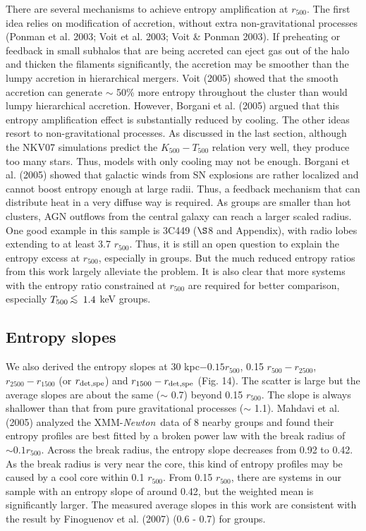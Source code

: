 \documentclass{aastex}
\newcommand{\lsim}{\mbox{\hspace{.2em}\raisebox{.5ex}{$<$}\hspace{-.8em}\raisebox{-.5ex}{$\sim$}
\hspace{.2em}}}
\def\xmm        {XMM-{\em Newton}\/}
\begin{document}
There are several mechanisms to achieve entropy amplification at $r_{500}$.
The first idea relies on modification of accretion, without extra non-gravitational
processes (Ponman et al. 2003; Voit et al. 2003; Voit \& Ponman 2003).
If preheating or feedback in small subhalos that are being accreted can eject gas out
of the halo and thicken the filaments significantly, the accretion may be smoother
than the lumpy accretion in hierarchical mergers. Voit (2005) showed that the smooth
accretion can generate $\sim$ 50\% more entropy throughout the cluster than would
lumpy hierarchical accretion. However, Borgani et al. (2005) argued that this
entropy amplification effect is substantially reduced by cooling.
The other ideas resort to non-gravitational processes.
As discussed in the last section, although the NKV07 simulations predict the $K_{500} - T_{500}$
relation very well, they produce too many stars. Thus, models with only cooling may
not be enough. Borgani et al. (2005) showed that galactic winds from SN explosions
are rather localized and cannot boost entropy enough at large radii.
Thus, a feedback mechanism that can distribute heat in a very diffuse way is required.
As groups are smaller than hot clusters, AGN outflows from the central galaxy
can reach a larger scaled radius. One good example in this sample is 3C449 ($\S$8 and
Appendix), with radio lobes extending to at least 3.7 $r_{500}$.
Thus, it is still an open question to explain the entropy excess at $r_{500}$, especially
in groups. But the much reduced entropy ratios from this work largely alleviate the
problem.
It is also clear that more systems with the entropy ratio constrained at $r_{500}$
are required for better comparison, especially $T_{500} \lsim 1.4$ keV groups.

\subsection{Entropy slopes}

We also derived the entropy slopes at 30 kpc$ - 0.15 r_{500}$, 0.15 $r_{500} - r_{2500}$,
$r_{2500} - r_{1500}$ (or $r_{\rm det, spe}$) and $r_{1500} - r_{\rm det, spe}$ (Fig. 14).
The scatter is large but the average slopes are about the same ($\sim$ 0.7) beyond
0.15 $r_{500}$. The slope is always shallower than that from pure gravitational processes
($\sim$ 1.1).
Mahdavi et al. (2005) analyzed the \xmm\ data of 8 nearby groups and found their
entropy profiles are best fitted by a broken power law with the break radius of
$\sim 0.1 r_{500}$. Across the break radius, the entropy slope decreases from 0.92
to 0.42. As the break radius is very near the core, this kind of entropy profiles
may be caused by a cool core within 0.1 $r_{500}$. From 0.15 $r_{500}$, there are
systems in our sample with an entropy slope of around 0.42, but the weighted mean
is significantly larger. The measured average slopes in this work are consistent with
the result by Finoguenov et al. (2007) (0.6 - 0.7) for groups.
\end{document}
